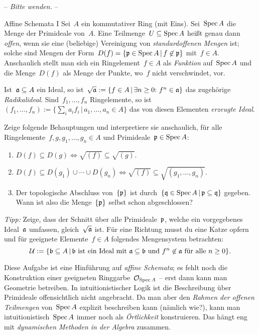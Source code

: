\documentclass{uebblatt}
\begin{document}
\begin{center}-- \emph{Bitte wenden.} --\end{center}

\newpage

\begin{aufgabe}{Affine Schemata I}
Sei~$A$ ein kommutativer Ring (mit Eins). Sei~$\operatorname{Spec} A$ die Menge der Primideale
von~$A$. Eine Teilmenge~$U \subseteq \operatorname{Spec} A$ heißt genau dann \emph{offen},
wenn sie eine (beliebige) Vereinigung von \emph{standardoffenen Mengen}
ist; solche sind Mengen der Form~$D(f) = \{ \mathfrak{p} \in \operatorname{Spec} A \,|\, f \not\in
\mathfrak{p} \}$ mit~$f \in A$. Anschaulich stellt man sich ein Ringelement~$f \in A$
als \emph{Funktion} auf~$\operatorname{Spec} A$ und die Menge~$D(f)$ als Menge der Punkte,
wo~$f$ nicht verschwindet, vor.

Ist~$\mathfrak{a} \subseteq A$ ein Ideal, so ist~$\sqrt{\mathfrak{a}} := \{ f \in A \,|\,
\exists n \geq 0{:}\ f^n \in \mathfrak{a} \}$ das zugehörige \emph{Radikalideal}.
Sind~$f_1,\ldots,f_n$ Ringelemente, so ist~$(f_1,\ldots,f_n) := \{ \sum_i a_i
f_i \,|\, a_1,\ldots,a_n \in A \}$ das von diesen Elementen \emph{erzeugte
Ideal}.

Zeige folgende Behauptungen und interpretiere sie anschaulich, für alle
Ringelemente~$f,g,g_1,\ldots,g_n \in A$ und Primideale~$\mathfrak{p} \in \operatorname{Spec} A$:
\begin{enumerate}
\item $D(f) \subseteq D(g) \Longleftrightarrow \sqrt{(f)} \subseteq
\sqrt{(g)}$.
\item $D(f) \subseteq D(g_1) \cup \cdots \cup D(g_n) \Longleftrightarrow
\sqrt{(f)} \subseteq \sqrt{(g_1,\ldots,g_n)}$.
\item Der topologische Abschluss von~$\{\mathfrak{p}\}$ ist
durch~$\{ \mathfrak{q} \in \operatorname{Spec} A \,|\, \mathfrak{p} \subseteq \mathfrak{q} \}$ gegeben.
Wann ist also die Menge~$\{\mathfrak{p}\}$ selbst schon abgeschlossen?
\end{enumerate}

\emph{Tipp:} Zeige, dass der Schnitt über alle Primideale~$\mathfrak{p}$, welche ein
vorgegebenes Ideal~$\mathfrak{a}$ umfassen, gleich~$\sqrt{\mathfrak{a}}$ ist. Für eine Richtung
musst du eine Katze opfern und für geeignete Elemente~$f \in A$
folgendes Mengensystem betrachten:
\[ \mathcal{U} := \{ \mathfrak{b} \subseteq A \,|\, \text{$\mathfrak{b}$ ist ein Ideal mit $\mathfrak{a}
\subseteq \mathfrak{b}$ und~$f^n \not\in \mathfrak{a}$ für alle~$n \geq 0$} \}. \]

Diese Aufgabe ist eine Hinführung auf \emph{affine Schemata}; es fehlt noch
die Konstruktion einer geeigneten Ringgarbe~$\mathcal{O}_{\operatorname{Spec} A}$ -- erst dann kann
man Geometrie betreiben.
In intuitionistischer Logik ist die Beschreibung über
Primideale offensichtlich nicht angebracht. Da man aber den \emph{Rahmen der
offenen Teilmengen} von~$\operatorname{Spec} A$ explizit beschreiben kann (nämlich wie?),
kann man intuitionistisch~$\operatorname{Spec} A$ immer noch als \emph{Örtlichkeit}
konstruieren. Das hängt eng mit \emph{dynamischen Methoden in der Algebra}
zusammen.
\end{aufgabe}
\end{document}
